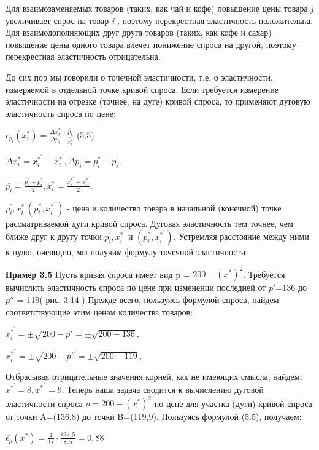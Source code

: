 \documentclass[12pt, 4paper]{book}
\begin{document}
{Для взаимозаменяемых товаров (таких, как чай и кофе) повышение цены товара \textit{j} увеличивает спрос на товар \textit{i} , поэтому перекрестная эластичность положительна. Для взаимодополняющих друг друга товаров (таких, как кофе и сахар) повышение цены одного товара влечет понижение спроса на другой, поэтому перекрестная эластичность отрицательна.
\par

До сих пор мы говорили о точечной эластичности, т.е. о эластичности, измеряемой в отдельной точке кривой спроса. Если требуется измерение эластичности на отрезке (точнее, на дуге) кривой спроса, то применяют дуговую эластичность спроса по цене: 
\begin{center}
$\bar{\epsilon_{p_{i}}}(x_{i}^{*})= \frac{\Delta x_{i}^{*}}{\Delta p_i} \cdot \frac{\bar{p_i}}{\bar{x_{i}^{*}}}$ (5.5)
\end{center}

\begin{center}
$\Delta x_{i}^{*} = x_{i}^{*^{''}} - x_{i}^{*^{'}}, \Delta p_i = p_{i}^{''} - p_{i}^{'},$
\end{center}
\begin{center}
$\bar{p_i}=\frac{p_{i}^{''} + p_{i}^{'}}{2}, x_{i}^{*} = \frac{x_{i}^{*^{''}} + x_{i}^{*^{'}}}{2},$
\end{center}
$p_{i}^{'},x_{i}^{*^{'}} (p_{i}^{''},x_{i}^{*^{''}})$ - цена и количество товара в начальной (конечной) точке рассматриваемой дуги кривой спроса. Дуговая эластичность тем точнее, чем ближе друг к другу точки  $p_{i}^{'},x_{i}^{*^{'}}$ и  $(p_{i}^{''},x_{i}^{*^{''}})$. Устремляя расстояние между ними к нулю, очевидно, мы получим формулу точечной эластичности. 
\par

\textbf{Пример 3.5 }Пусть кривая спроса имеет вид p = $200 - (x^{*})^{2}$. Требуется вычислить эластичность спроса по цене при изменении последней от  $p'$=136 до $p''$ = 119( рис. 3.14 ) Прежде всего, пользуясь формулой спроса, найдем соответствующие этим ценам количества товаров: 
\begin{center}
$x_{i}^{*^{'}}=\pm \sqrt{200-p'} = \pm \sqrt{200-136},$
\end{center}
\begin{center}
$x_{i}^{*^{''}}=\pm \sqrt{200-p''} = \pm \sqrt{200-119},$
\end{center}
\par

Отбрасывая отрицательные значения корней, как не имеющих смысла, найдем:  $x^{*^{'}}=8,x^{*^{''}}=9$. Теперь наша задача сводится к вычислению дуговой эластичности спроса $p=200 - (x^{*})^{2}$ по цене для участка (дуги) кривой спроса от точки A=(136,8) до точки B=(119,9). Пользуясь формулой (5.5), получаем: 
\begin{center}
$\bar{\epsilon_p}(x^{*})=\frac{1}{17} \cdot \frac{127,5}{8,5} = 0,88$
\end{center}
\par

}
\end{document}
